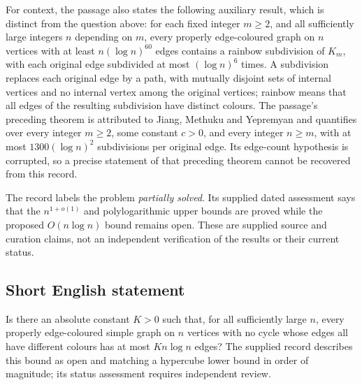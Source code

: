 \documentclass[11pt]{article}
\begin{document}
For context, the passage also states the following auxiliary result, which is distinct from the question above: for each fixed integer \(m\geq 2\), and all sufficiently large integers \(n\) depending on \(m\), every properly edge-coloured graph on \(n\) vertices with at least \(n(\log n)^{60}\) edges contains a rainbow subdivision of \(K_m\), with each original edge subdivided at most \((\log n)^6\) times. A subdivision replaces each original edge by a path, with mutually disjoint sets of internal vertices and no internal vertex among the original vertices; rainbow means that all edges of the resulting subdivision have distinct colours. The passage's preceding theorem is attributed to Jiang, Methuku and Yepremyan and quantifies over every integer \(m\geq 2\), some constant \(c>0\), and every integer \(n\geq m\), with at most \(1300(\log n)^2\) subdivisions per original edge. Its edge-count hypothesis is corrupted, so a precise statement of that preceding theorem cannot be recovered from this record.

The record labels the problem \emph{partially solved}. Its supplied dated assessment says that the \(n^{1+o(1)}\) and polylogarithmic upper bounds are proved while the proposed \(O(n\log n)\) bound remains open. These are supplied source and curation claims, not an independent verification of the results or their current status.
\subsection{Short English statement}
Is there an absolute constant \(K>0\) such that, for all sufficiently large \(n\), every properly edge-coloured simple graph on \(n\) vertices with no cycle whose edges all have different colours has at most \(Kn\log n\) edges? The supplied record describes this bound as open and matching a hypercube lower bound in order of magnitude; its status assessment requires independent review.
\end{document}
